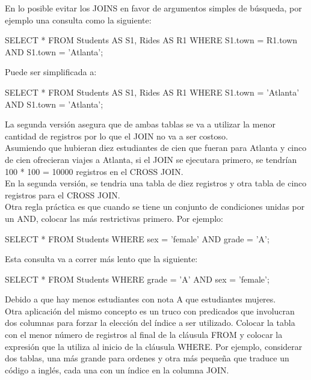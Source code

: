 En lo posible evitar los JOINS en favor de argumentos simples de búsqueda, por ejemplo una consulta como la siguiente:

\begin{pyglist}
SELECT *
  FROM Students AS S1, Rides AS R1
 WHERE S1.town = R1.town
 AND   S1.town = 'Atlanta';
\end{pyglist}

Puede ser simplificada a:\\

\begin{pyglist}
SELECT *
  FROM Students AS S1, Rides AS R1
 WHERE S1.town = 'Atlanta'
 AND   S1.town = 'Atlanta';
\end{pyglist}

La segunda versión asegura que de ambas tablas se va a utilizar la menor cantidad de registros por lo que el JOIN no va a ser costoso.\\

Asumiendo que hubieran diez estudiantes de cien que fueran para Atlanta y cinco de cien ofrecieran viajes a Atlanta, si el JOIN se ejecutara primero, se tendrían 100 * 100 = 10000 registros en el CROSS JOIN. \\

En la segunda versión, se tendria una tabla de diez registros y otra tabla de cinco registros para el CROSS JOIN.\\

Otra regla práctica es que cuando se tiene un conjunto de condiciones unidas por un AND, colocar las más restrictivas primero. Por ejemplo:\\

\begin{pyglist}
SELECT *
  FROM Students
 WHERE sex = 'female'
   AND grade = 'A';
\end{pyglist}

Esta consulta va a correr más lento que la siguiente:\\

\begin{pyglist}
SELECT *
  FROM Students
 WHERE grade = 'A'
   AND sex = 'female';
\end{pyglist}

Debido a que hay menos estudiantes con nota A que estudiantes mujeres.\\

Otra aplicación del mismo concepto es un truco con predicados que involucran dos columnas para forzar la elección del índice a ser utilizado. Colocar la tabla con el menor número de registros al final de la cláusula FROM y colocar la expresión que la utiliza al inicio de la cláusula WHERE. Por ejemplo, considerar dos tablas, una más grande para ordenes y otra más pequeña que traduce un código a inglés, cada una con un índice en la columna JOIN.\\

